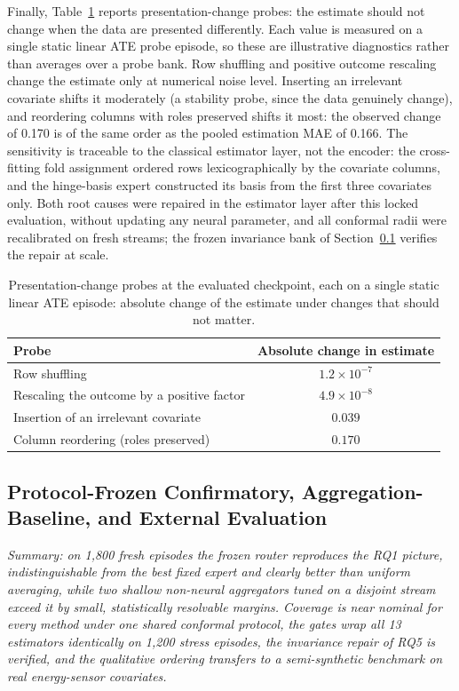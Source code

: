 \documentclass[electronics,article,submit,oneauthor]{Definitions/mdpi}
\begin{document}
Finally, Table~\ref{tab:probes} reports presentation-change probes: the estimate should not change when the data are presented differently. Each value is measured on a single static linear ATE probe episode, so these are illustrative diagnostics rather than averages over a probe bank. Row shuffling and positive outcome rescaling change the estimate only at numerical noise level. Inserting an irrelevant covariate shifts it moderately (a stability probe, since the data genuinely change), and reordering columns with roles preserved shifts it most: the observed change of 0.170 is of the same order as the pooled estimation MAE of 0.166. The sensitivity is traceable to the classical estimator layer, not the encoder: the cross-fitting fold assignment ordered rows lexicographically by the covariate columns, and the hinge-basis expert constructed its basis from the first three covariates only. Both root causes were repaired in the estimator layer after this locked evaluation, without updating any neural parameter, and all conformal radii were recalibrated on fresh streams; the frozen invariance bank of Section~\ref{sec:assessment-confirmatory} verifies the repair at scale.

\begin{table}[!t]
\caption{Presentation-change probes at the evaluated checkpoint, each on a single static linear ATE episode: absolute change of the estimate under changes that should not matter.\label{tab:probes}}
\begin{tabularx}{\textwidth}{Xc}
\toprule
\textbf{Probe} & \textbf{Absolute change in estimate}\\
\midrule
Row shuffling & $1.2\times10^{-7}$\\
Rescaling the outcome by a positive factor & $4.9\times10^{-8}$\\
Insertion of an irrelevant covariate & $0.039$\\
Column reordering (roles preserved) & $0.170$\\
\bottomrule
\end{tabularx}
\end{table}

\subsection{Protocol-Frozen Confirmatory, Aggregation-Baseline, and External Evaluation}\label{sec:assessment-confirmatory}

\emph{Summary: on 1,800 fresh episodes the frozen router reproduces the RQ1 picture, indistinguishable from the best fixed expert and clearly better than uniform averaging, while two shallow non-neural aggregators tuned on a disjoint stream exceed it by small, statistically resolvable margins. Coverage is near nominal for every method under one shared conformal protocol, the gates wrap all 13 estimators identically on 1,200 stress episodes, the invariance repair of RQ5 is verified, and the qualitative ordering transfers to a semi-synthetic benchmark on real energy-sensor covariates.}
\end{document}
